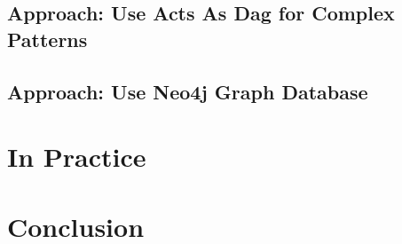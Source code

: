 \documentclass[green, 12pt]{beamer}
\begin{document}
\subsection{Approach: Use Acts As Dag for Complex Patterns}

\subsection{Approach: Use Neo4j Graph Database}


\section{In Practice}


\section{Conclusion}


\end{document}
